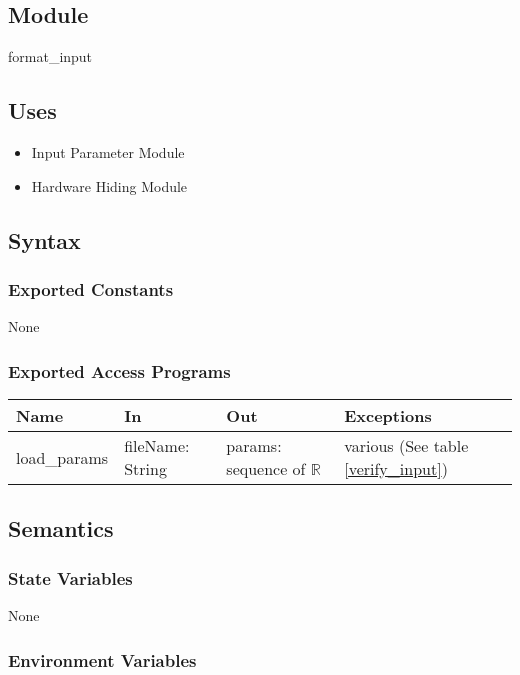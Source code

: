 \documentclass[12pt, titlepage]{article}
\begin{document}
\subsection{Module}

format\_input 

\subsection{Uses}

\begin{itemize}
    \item Input Parameter Module
    \item Hardware Hiding Module
\end{itemize}

\subsection{Syntax}

\subsubsection{Exported Constants}
None 
\subsubsection{Exported Access Programs}

\begin{center}
\begin{tabular}{p{2.5cm} p{3.5cm} p{4cm} p{4cm}}
\hline
\textbf{Name} & \textbf{In} & \textbf{Out} & \textbf{Exceptions} \\
\hline
load\_params & fileName: String & params: sequence of $\mathbb{R}$ & various (See table \ref{verify_input}) \\
\hline
\end{tabular}
\end{center}

\subsection{Semantics}

\subsubsection{State Variables}

None

\subsubsection{Environment Variables}
\end{document}
